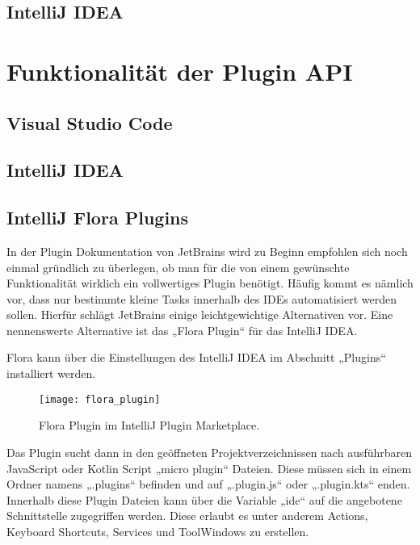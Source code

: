 \subsection{IntelliJ IDEA}


\section{Funktionalität der Plugin API}
\label{sec:FunktionalitätDerPluginAPI}

\subsection{Visual Studio Code}

\subsection{IntelliJ IDEA}

\subsection{IntelliJ Flora Plugins}

In der Plugin Dokumentation von JetBrains wird zu Beginn 
empfohlen sich noch einmal gründlich zu überlegen, ob man 
für die von einem gewünschte Funktionalität wirklich ein 
vollwertiges Plugin benötigt. Häufig kommt es nämlich vor, 
dass nur bestimmte kleine Tasks innerhalb des IDEs 
automatisiert werden sollen. Hierfür schlägt JetBrains 
einige leichtgewichtige Alternativen vor. Eine nennenswerte 
Alternative ist das „Flora Plugin“ für das IntelliJ IDEA. 

Flora kann über die Einstellungen des IntelliJ IDEA 
im Abschnitt „Plugins“ installiert werden.


\begin{figure}
    \centering
    \texttt{[image: flora\_plugin]}
    \caption{Flora Plugin im IntelliJ Plugin Marketplace.}
    \label{fig:FloraPlugin}
\end{figure}    
 
Das Plugin sucht dann in den geöffneten Projektverzeichnissen
nach ausführbaren JavaScript oder Kotlin Script „micro plugin“ 
Dateien. Diese müssen sich in einem Ordner namens „.plugins“ 
befinden und auf „.plugin.js“ oder „.plugin.kts“ enden.
Innerhalb diese Plugin Dateien kann über die Variable „ide“ auf 
die angebotene Schnittstelle zugegriffen werden. Diese erlaubt 
es unter anderem Actions, Keyboard Shortcuts, Services und 
ToolWindows zu erstellen.

